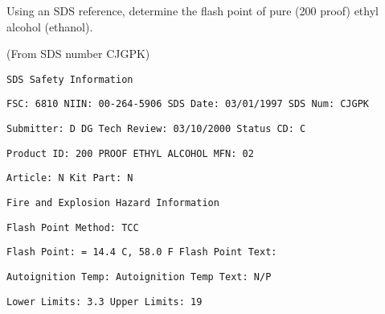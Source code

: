 

Using an SDS reference, determine the flash point of pure (200 proof) ethyl alcohol (ethanol).

\vskip 10pt







(From SDS number CJGPK)

\vskip 10pt


{\tt SDS Safety Information}

{\tt FSC: 6810 NIIN: 00-264-5906 SDS Date: 03/01/1997 SDS Num: CJGPK}

{\tt Submitter: D DG Tech Review: 03/10/2000 Status CD: C}

{\tt Product ID: 200 PROOF ETHYL ALCOHOL MFN: 02}

{\tt Article: N Kit Part: N}

\vskip 10pt

{\tt Fire and Explosion Hazard Information}

{\tt Flash Point Method: TCC}

{\tt Flash Point: = 14.4 C, 58.0 F Flash Point Text:}

{\tt Autoignition Temp: Autoignition Temp Text: N/P}

{\tt Lower Limits: 3.3 Upper Limits: 19}











